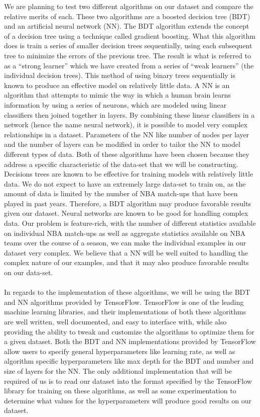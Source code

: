 \documentclass[letterpaper]{article} %
\begin{document}
We are planning to test two different algorithms on our dataset and compare the relative merits of each. These two algorithms are a boosted decision tree (BDT) and an artificial neural network (NN). The BDT algorithm extends the concept of a decision tree using a technique called gradient boosting. What this algorithm does is train a series of smaller decision trees sequentially, using each subsequent tree to minimize the errors of the previous tree. The result is what is referred to as a “strong learner” which we have created from a series of “weak learners” (the individual decision trees). This method of using binary trees sequentially is known to produce an effective model on relatively little data. A NN is an algorithm that attempts to mimic the way in which a human brain learns information by using a series of neurons, which are modeled using linear classifiers then joined together in layers. By combining these linear classifiers in a network (hence the name neural network), it is possible to model very complex relationships in a dataset. Parameters of the NN like number of nodes per layer and the number of layers can be modified in order to tailor the NN to model different types of data. Both of these algorithms have been chosen because they address a specific characteristic of the data-set that we will be constructing. Decisions trees are known to be effective for training models with relatively little data. We do not expect to have an extremely large data-set to train on, as the amount of data is limited by the number of NBA match-ups that have been played in past years. Therefore, a BDT algorithm may produce favorable results given our dataset. Neural networks are known to be good for handling complex data. Our problem is feature-rich, with the number of different statistics available on individual NBA match-ups as well as aggregate statistics available on NBA teams over the course of a season, we can make the individual examples in our dataset very complex. We believe that a 
NN will be well suited to handling the complex nature of our examples, and that it may also produce favorable results on our data-set. \\ \\ 
In regards to the implementation of these algorithms, we will be using the BDT and NN algorithms provided by TensorFlow. TensorFlow is one of the leading machine learning libraries, and their implementations of both these algorithms are well written, well documented, and easy to interface with, while also providing the ability to tweak and customize the algorithms to optimize them for a given dataset. Both the BDT and NN implementations provided by TensorFlow allow users to specify general hyperparameters like learning rate, as well as algorithm specific hyperparameters like max depth for the BDT and number and size of layers for the NN. The only additional implementation that will be required of us is to read our dataset into the format specified by the TensorFlow library for training on these algorithms, as well as some experimentation to determine what values for the hyperparameters will produce good results on our dataset. \\ \\	
\end{document}
